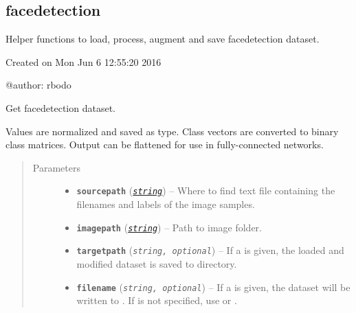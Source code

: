 \documentclass[letterpaper,10pt,english]{sphinxmanual}
\begin{document}
\subsection{facedetection}
\label{snntoolbox.io_utils:module-snntoolbox.io_utils.facedetection_load}\label{snntoolbox.io_utils:facedetection}
Helper functions to load, process, augment and save facedetection dataset.

Created on Mon Jun  6 12:55:20 2016

@author: rbodo

\begin{fulllineitems}
\label{snntoolbox.io_utils:snntoolbox.io_utils.facedetection_load.get_facedetection}
Get facedetection dataset.

Values are normalized and saved as  type. Class vectors are
converted to binary class matrices. Output can be flattened for use in
fully-connected networks.
\begin{quote}\begin{description}
\item[{Parameters}] \leavevmode\begin{itemize}
\item {} 
\textbf{\texttt{sourcepath}} (\href{https://docs.python.org/library/string.html\#module-string}{\emph{\texttt{string}}}) -- Where to find text file containing the filenames and labels of the
image samples.

\item {} 
\textbf{\texttt{imagepath}} (\href{https://docs.python.org/library/string.html\#module-string}{\emph{\texttt{string}}}) -- Path to image folder.

\item {} 
\textbf{\texttt{targetpath}} (\emph{\texttt{string, optional}}) -- If a  is given, the loaded and modified dataset is saved to
 directory.

\item {} 
\textbf{\texttt{filename}} (\emph{\texttt{string, optional}}) -- If a  is given, the dataset will be written to .
If  is not specified, use  or
.


\end{itemize}
\end{description}
\end{quote}
\end{fulllineitems}
\end{document}
